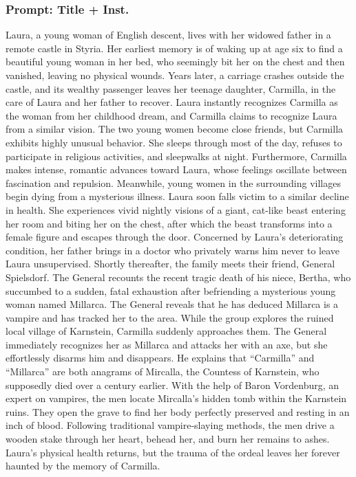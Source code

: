 \documentclass{article} %
\begin{document}
\subsubsection{Prompt: Title + Inst.}

Laura, a young woman of English descent, lives with her widowed father in a remote castle in Styria. Her earliest memory is of waking up at age six to find a beautiful young woman in her bed, who seemingly bit her on the chest and then vanished, leaving no physical wounds. Years later, a carriage crashes outside the castle, and its wealthy passenger leaves her teenage daughter, Carmilla, in the care of Laura and her father to recover. Laura instantly recognizes Carmilla as the woman from her childhood dream, and Carmilla claims to recognize Laura from a similar vision. The two young women become close friends, but Carmilla exhibits highly unusual behavior. She sleeps through most of the day, refuses to participate in religious activities, and sleepwalks at night. Furthermore, Carmilla makes intense, romantic advances toward Laura, whose feelings oscillate between fascination and repulsion. \textcolor{skipred}{Meanwhile, young women in the surrounding villages begin dying from a mysterious illness.} Laura soon falls victim to a similar decline in health. She experiences vivid nightly visions of a giant, cat-like beast entering her room and biting her on the chest, after which the beast transforms into a female figure and escapes through the door. Concerned by Laura's deteriorating condition, her father brings in a doctor who privately warns him never to leave Laura unsupervised. Shortly thereafter, the family meets their friend, General Spielsdorf. The General recounts the recent tragic death of his niece, Bertha, who succumbed to a sudden, fatal exhaustion after befriending a mysterious young woman named Millarca. \textcolor{skipred}{The General reveals that he has deduced Millarca is a vampire and has tracked her to the area. While the group explores the ruined local village of Karnstein, Carmilla suddenly approaches them.} The General immediately recognizes her as Millarca and attacks her with an axe, but she effortlessly disarms him and disappears. He explains that ``Carmilla'' and ``Millarca'' are both anagrams of Mircalla, the Countess of Karnstein, who supposedly died over a century earlier. With the help of Baron Vordenburg, an expert on vampires, the men locate Mircalla's hidden tomb within the Karnstein ruins. They open the grave to find her body perfectly preserved and resting in an inch of blood. Following traditional vampire-slaying methods, the men drive a wooden stake through her heart, behead her, and burn her remains to ashes. Laura’s physical health returns, but the trauma of the ordeal leaves her forever haunted by the memory of Carmilla.
\end{document}
